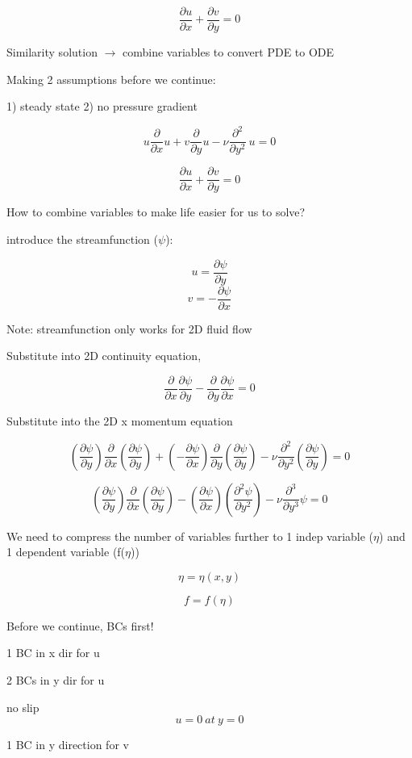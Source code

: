 \documentclass[11pt]{article}
\begin{document}
$$\frac{\partial u}{\partial x} + \frac{\partial v}{\partial y} = 0$$

Similarity solution $\rightarrow$ combine variables to convert PDE to ODE

Making 2 assumptions before we continue:

1) steady state
2) no pressure gradient

$$ u  \frac{\partial}{\partial x } u + v  \frac{\partial}{\partial y} u -  \nu  \frac{\partial^2}{\partial y^2} \ u  =  0$$

$$\frac{\partial u}{\partial x} + \frac{\partial v}{\partial y} = 0$$

How to combine variables to make life easier for us to solve?

introduce the streamfunction ($\psi$):

$$u = \frac{\partial \psi}{\partial y}$$
$$v = -\frac{\partial \psi}{\partial x}$$

Note: streamfunction only works for 2D fluid flow

Substitute into 2D continuity equation,

$$\frac{\partial}{\partial x} \frac{\partial \psi}{\partial y} - \frac{\partial}{\partial y}  \frac{\partial \psi}{\partial x}= 0$$

Substitute into the 2D x momentum equation

$$ (\frac{\partial \psi}{\partial y})  \frac{\partial}{\partial x } (\frac{\partial \psi}{\partial y}) + (-\frac{\partial \psi}{\partial x})  \frac{\partial}{\partial y} (\frac{\partial \psi}{\partial y}) -  \nu  \frac{\partial^2}{\partial y^2} (\frac{\partial \psi}{\partial y})  =  0$$


$$ (\frac{\partial \psi}{\partial y})  \frac{\partial}{\partial x } (\frac{\partial \psi}{\partial y}) - (\frac{\partial \psi}{\partial x})  (\frac{\partial^2 \psi}{\partial y^2}) -  \nu  \frac{\partial^3}{\partial y^3} \psi  =  0$$

We need to compress the number of variables further to 1 indep variable ($\eta$) and 1 dependent variable (f($\eta$))

$$\eta= \eta(x,y)$$

$$f= f(\eta)$$

Before we continue, BCs first!

1 BC in x dir for u

2 BCs in y dir for u 

no slip
$$u=0 \ at \ y=0$$

1 BC in y direction for v
\end{document}
